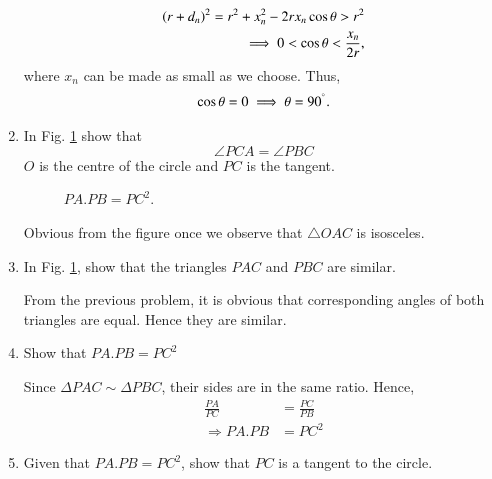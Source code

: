 \begin{enumerate}[label=\arabic*.,ref=\thesubsection.\theenumi]
%
\begin{align}
\left(r+d_n\right)^2 = r^2 + x_n^2 - 2rx_n\cos\theta > r^2 
\\
\implies  0 <\cos\theta < \frac{x_n}{2r},
\end{align}
%
where $x_n$ can be made as small as we choose.  Thus, 
%
\begin{align}
\cos \theta = 0 \implies \theta  = 90 ^{\degree}.
\end{align}

%
\item
In Fig. \ref{ch4_tangent_prod} show that 
%
\begin{equation}
\angle PCA = \angle PBC
\end{equation}
%
$O$ is the centre of the circle and $PC$ is the tangent.

	\begin{figure}[!ht]
		\begin{center}
			
			\resizebox{\columnwidth}{!}{}
		\end{center}
		\caption{$PA.PB = PC^2$.}
		\label{ch4_tangent_prod}	
	\end{figure}

%
\solution Obvious from the figure once we observe that $\triangle OAC$ is isosceles.
%
%
\item
	In Fig. \ref{ch4_tangent_prod}, show that the triangles $PAC$ and $PBC$ are similar.

\solution From the previous problem, it is obvious that corresponding angles of both triangles are equal.  Hence they are similar.
%
\item
	Show that $PA.PB = PC^2$

\solution Since $\Delta PAC \sim \Delta PBC$, their sides are in the same ratio.  Hence,
%
\begin{align}
\frac{PA}{PC} &= \frac{PC}{PB} \\
\Rightarrow PA.PB &=PC^2
\end{align}
%
\item
Given that $PA.PB = PC^2$, show that $PC$ is a tangent to the circle.


\end{enumerate}

